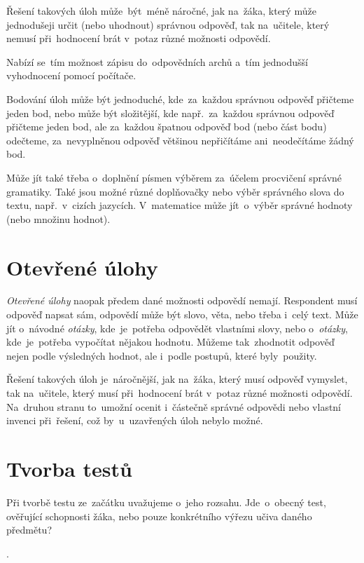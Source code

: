 \documentclass[11pt,a4paper]{report}
\begin{document}
            Řešení takových úloh může~být~méně náročné, jak na~žáka, který může jednodušeji určit (nebo uhodnout) správnou odpověď, tak na~učitele, který nemusí při~hodnocení brát v~potaz různé možnosti odpovědí.

            Nabízí se~tím možnost zápisu do~odpovědních archů a~tím jednodušší vyhodnocení pomocí počítače.

            Bodování úloh může být jednoduché, kde~za~každou správnou odpověď přičteme jeden bod, nebo může být složitější, kde např.~za~každou správnou odpověď přičteme jeden bod, ale za~každou špatnou odpověď bod (nebo část bodu) odečteme, za~nevyplněnou odpověď většinou nepřičítáme ani~neodečítáme žádný bod.

            Může jít také třeba o~doplnění písmen výběrem za~účelem procvičení správné gramatiky. Také jsou možné různé doplňovačky nebo výběr správného slova do textu, např.~v~cizích jazycích. V~matematice může jít~o~výběr správné hodnoty (nebo množinu hodnot).

        \section{Otevřené úlohy}
            \emph{Otevřené úlohy} naopak předem dané možnosti odpovědí nemají. Respondent musí odpověď napsat sám, odpovědí může být slovo, věta, nebo třeba i~celý text. Může jít o~návodné \emph{otázky}, kde~je~potřeba odpovědět vlastními slovy, nebo o~\emph{otázky}, kde~je~potřeba vypočítat nějakou hodnotu. Můžeme tak~zhodnotit odpověď nejen podle výsledných hodnot, ale i~podle postupů, které byly~použity.

            Řešení takových úloh je~náročnější, jak na~žáka, který musí odpověď vymyslet, tak na~učitele, který musí při~hodnocení brát v~potaz různé možnosti odpovědí. Na~druhou stranu to~umožní ocenit i~částečně správné odpovědi nebo vlastní invenci při~řešení, což by~u~uzavřených úloh nebylo možné. \cite{rozhlasOUtazky}

        \section{Tvorba testů}
            Při tvorbě testu ze~začátku uvažujeme o~jeho rozsahu. Jde~o~obecný test, ověřující schopnosti žáka, nebo pouze konkrétního výřezu učiva daného předmětu?

            . \cite{Suchoradsky:testy}
            
\end{document}
